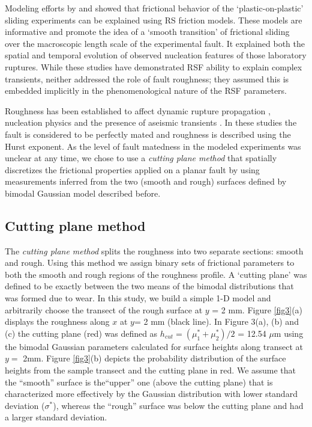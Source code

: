 \documentclass[preprint,1p, 10pt,authoryear]{elsarticle}
\begin{document}
Modeling efforts by \citet{Kaneko2011} and \citet{Kaneko2016} showed that frictional behavior of the `plastic-on-plastic' sliding experiments can be explained using RS friction models. These models are informative and promote the idea of a `smooth transition' of frictional sliding over the macroscopic length scale of the experimental fault. It explained both the spatial and temporal evolution of observed nucleation features of those laboratory ruptures. While these studies have demonstrated RSF ability to explain complex transients, neither addressed the role of fault roughness; they assumed this is embedded implicitly in the phenomenological nature of the RSF parameters.

Roughness has been established to affect dynamic rupture propagation \citep[e.g.][]{Dunham2011, Fang2013}, nucleation physics \citep[e.g.][]{Tal2018} and the presence of aseismic transients \citep{Ozawa2019}. In these studies the fault is considered to be perfectly mated and roughness is described using the Hurst exponent. As the level of fault matedness in the modeled experiments was unclear at any time, we chose to use a \textit{cutting plane method} that spatially discretizes the frictional properties applied on a planar fault by using measurements inferred from the two (smooth and rough) surfaces defined by bimodal Gaussian model described before.

\subsection{Cutting plane method}
The \textit{cutting plane method} splits the roughness into two separate sections: smooth and rough. Using this method we assign binary sets of frictional parameters to both the smooth and rough regions of the roughness profile. A `cutting plane' was defined to be exactly between the two means of the bimodal distributions that was formed due to wear. In this study, we build a simple 1-D model and arbitrarily choose the transect of the rough surface at $y$ = 2 mm. Figure \ref{fig3}(a) displays the roughness along $x$ at $y$= 2 mm (black line). In Figure 3(a), (b) and (c) the cutting plane (red) was defined as $h_{cut} = \left(\mu^{*}_{1}+\mu^{*}_{2} \right)/2$ = 12.54 $\mu$m using the bimodal Gaussian parameters calculated for surface heights along transect at $y = $ 2mm. Figure \ref{fig3}(b) depicts the probability distribution of the surface heights from the sample transect and the cutting plane in red. We assume that the ``smooth'' surface is the``upper'' one (above the cutting plane) that is characterized more effectively by the Gaussian distribution with lower standard deviation ($\sigma^{*}$), whereas the ``rough'' surface was below the cutting plane and had a larger standard deviation.
\end{document}
